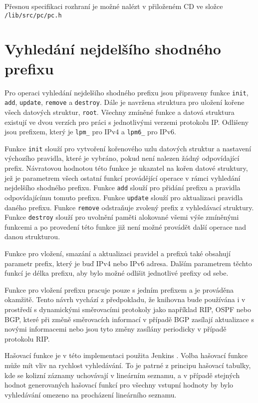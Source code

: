 Přesnou specifikaci rozhraní je možné nalézt v přiloženém CD ve složce \texttt{/lib/src/pc/pc.h}

\section{Vyhledání nejdelšího shodného prefixu}\label{api:lpm} %

Pro operaci vyhledání nejdelšího shodného prefixu jsou připraveny funkce
\texttt{init}, \texttt{add}, \texttt{update}, \texttt{remove} a \texttt{destroy}.
Dále je navržena struktura pro uložení kořene všech datových struktur, \texttt{root}.
Všechny zmíněné funkce a datová struktura existují ve dvou verzích pro práci s jednotlivými
verzemi protokolu IP. Odlišeny jsou prefixem, který je \texttt{lpm\_} pro IPv4 a
\texttt{lpm6\_} pro IPv6.

Funkce \texttt{init} slouží pro vytvoření kořenového uzlu datových struktur a
nastavení výchozího pravidla, které je vybráno, pokud není nalezen žádný odpovídající prefix.
Návratovou hodnotou této funkce je ukazatel na kořen datové struktury, jež je parametrem
všech ostatní funkcí provádějící operace v rámci vyhledání nejdelšího shodného prefixu.
Funkce \texttt{add} slouží pro přidání prefixu a pravidla odpovídajícímu tomuto prefixu.
Funkce \texttt{update} slouží pro aktualizaci pravidla daného prefixu.
Funkce \texttt{remove} odstraňuje zvolený prefix z vyhledávací struktury.
Funkce \texttt{destroy} slouží pro uvolnění paměti alokované všemi výše zmíněnými funkcemi
a po provedení této funkce již není možné provádět další operace nad danou strukturou.

Funkce pro vložení, smazání a aktualizaci pravidel a prefixů také obsahují parametr
prefix, který je buď IPv4 nebo IPv6 adresa. Dalším parametrem těchto funkcí je délka prefixu,
aby bylo možné odlišit jednotlivé prefixy od sebe.

Funkce pro vložení prefixu pracuje pouze s jedním prefixem a je prováděna okamžitě.
Tento návrh vychází z předpokladu, že knihovna bude používána i v prostředí s dynamickými směrovacími
protokoly jako například RIP, OSPF nebo BGP, které při změně směrovacích informací v případě BGP
zasílají aktualizace s novými informacemi nebo jsou tyto změny
zasílány periodicky v případě protokolu RIP.

Hašovací funkce je v této implementaci použita Jenkins \cite{jenkins}. Volba hašovací funkce
může mít vliv na rychlost vyhledávání. To je patrné z principu hašovací tabulky, kde se
kolizní záznamy uchovávají v lineárním seznamu, a v případě stejných hodnot generovaných
hašovací funkcí pro všechny vstupní hodnoty by bylo vyhledávání omezeno na procházení
lineárního seznamu.

